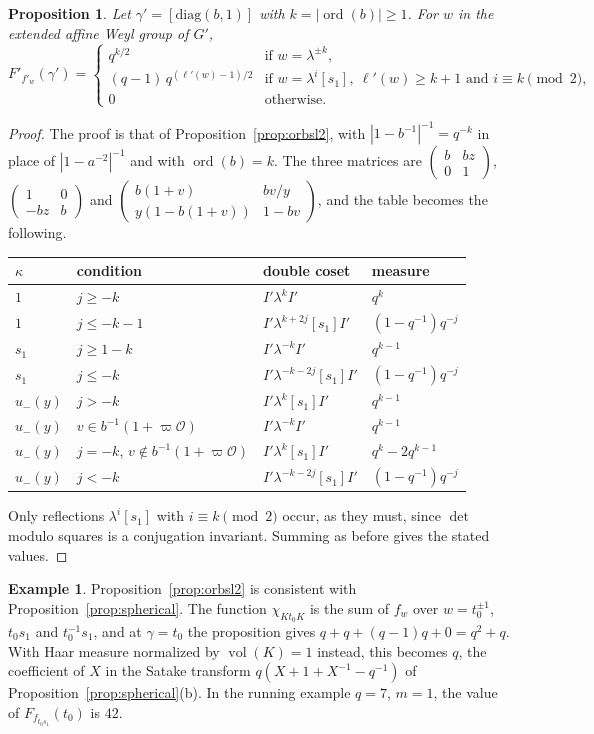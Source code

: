 \documentclass[12pt,letterpaper]{amsart}
\numberwithin{equation}{section}
\newtheorem{proposition}[theorem]{Proposition}
\theoremstyle{definition}
\newtheorem{example}[theorem]{Example}
\theoremstyle{remark}
\DeclareMathOperator{\vol}{vol}
\DeclareMathOperator{\ord}{ord}
\newcommand{\cO}{\mathcal{O}}
\newcommand{\mat}[4]{\begin{pmatrix} #1 & #2\\ #3 & #4\end{pmatrix}}
\begin{document}
\begin{proposition}
\label{prop:orbpgl}
Let $\gamma'=[\mathrm{diag}(b,1)]$ with $k=|\ord(b)|\geq1$. For $w$ in
the extended affine Weyl group of $G'$,
\[
F'_{f'_w}(\gamma')=
\begin{cases}
q^{k/2} & \mbox{if } w=\lambda^{\pm k},\\
(q-1)\,q^{(\ell'(w)-1)/2} & \mbox{if } w=\lambda^i[s_1],\ \ell'(w)\geq
k+1\mbox{ and } i\equiv k\pmod 2,\\
0 & \mbox{otherwise.}
\end{cases}
\]
\end{proposition}

\begin{proof}
The proof is that of Proposition~\ref{prop:orbsl2}, with
$|1-b^{-1}|^{-1}=q^{-k}$ in place of $|1-a^{-2}|^{-1}$ and with
$\ord(b)=k$. The three matrices are $\mat b{bz}01$, $\mat 10{-bz}b$
and $\mat{b(1+v)}{bv/y}{y(1-b(1+v))}{1-bv}$, and the table becomes the
following.
\begin{center}
\begin{tabular}{@{}llll@{}}
\toprule
$\kappa$ & condition & double coset & measure \\
\midrule
$1$ & $j\geq -k$ & $I'\lambda^kI'$ & $q^{k}$ \\
$1$ & $j\leq -k-1$ & $I'\lambda^{k+2j}[s_1]I'$ & $(1-q^{-1})q^{-j}$ \\
$s_1$ & $j\geq 1-k$ & $I'\lambda^{-k}I'$ & $q^{k-1}$ \\
$s_1$ & $j\leq -k$ & $I'\lambda^{-k-2j}[s_1]I'$ & $(1-q^{-1})q^{-j}$ \\
$u_-(y)$ & $j>-k$ & $I'\lambda^k[s_1]I'$ & $q^{k-1}$ \\
$u_-(y)$ & $v\in b^{-1}(1+\varpi\cO)$ & $I'\lambda^{-k}I'$ & $q^{k-1}$ \\
$u_-(y)$ & $j=-k$, $v\notin b^{-1}(1+\varpi\cO)$ & $I'\lambda^k[s_1]I'$
& $q^{k}-2q^{k-1}$ \\
$u_-(y)$ & $j<-k$ & $I'\lambda^{-k-2j}[s_1]I'$ & $(1-q^{-1})q^{-j}$ \\
\bottomrule
\end{tabular}
\end{center}
Only reflections $\lambda^i[s_1]$ with $i\equiv k\pmod 2$ occur, as
they must, since $\det$ modulo squares is a conjugation invariant.
Summing as before gives the stated values.
\end{proof}

\begin{example}
\label{ex:orbsl2}
Proposition~\ref{prop:orbsl2} is consistent with
Proposition~\ref{prop:spherical}. The function $\chi_{Kt_0K}$ is the
sum of $f_w$ over $w=t_0^{\pm1}$, $t_0s_1$ and $t_0^{-1}s_1$, and at
$\gamma=t_0$ the proposition gives $q+q+(q-1)q+0=q^2+q$. With Haar
measure normalized by $\vol(K)=1$ instead, this becomes $q$, the
coefficient of $X$ in the Satake transform
$q(X+1+X^{-1}-q^{-1})$ of Proposition~\ref{prop:spherical}(b). In the
running example $q=7$, $m=1$, the value of $F_{f_{t_0s_1}}(t_0)$ is
$42$.
\end{example}
\end{document}
